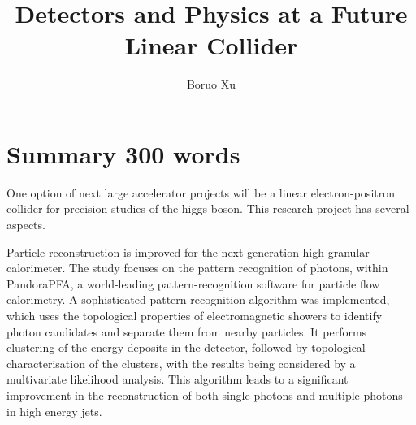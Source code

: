 \documentclass[11pt,tightenlines,print,twoside,onecolumn,aps,amsmath,amssymb]{revtex4}
\newcommand{\tstamp}{\today}
\begin{document}
\chead[\fancyplain{}{}]                 {\fancyplain{}{}}
\lfoot[\fancyplain{}{}]                 {\fancyplain{}{}}   %
\cfoot[\fancyplain{\thepage}{}]         {\fancyplain{\thepage}{}}
\rfoot[\fancyplain{}{}]  {\fancyplain{}{}}    %

\title{Detectors and Physics at a Future Linear Collider}
\author{Boruo Xu}

\begin{abstract}




\end{abstract}

\maketitle

\section{Summary 300 words}

One option of next large accelerator projects will be a linear electron-positron collider for precision studies of the higgs boson. This research project has several aspects.

Particle reconstruction is improved for the next generation high granular calorimeter. The study focuses on the pattern recognition of photons, within PandoraPFA, a world-leading pattern-recognition software for particle flow calorimetry. A sophisticated pattern recognition algorithm was implemented, which uses the topological properties of electromagnetic showers to identify photon candidates and separate them from nearby particles. It performs clustering of the energy deposits in the detector, followed by topological characterisation of the clusters, with the results being considered by a multivariate likelihood analysis. This algorithm leads to a significant improvement in the reconstruction of both single photons and multiple photons in high energy jets.
\end{document}

